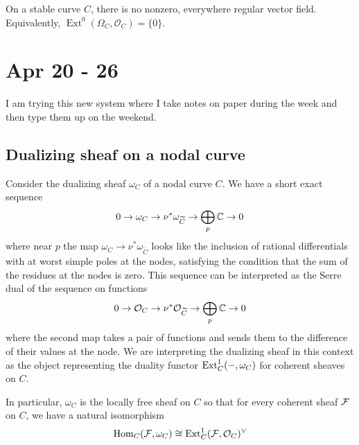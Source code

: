 \documentclass[12pt]{article}
\begin{document}
\begin{proposition}
On a stable curve \(C\), there is no nonzero, everywhere regular vector field. Equivalently, \(\operatorname{Ext}^0(\Omega_C, \mathcal{O}_C) = \{0\}\).
\end{proposition}

\section{Apr 20 - 26}
I am trying this new system where I take notes on paper during the week and then type them up on the weekend. 
\subsection{Dualizing sheaf on a nodal curve}
Consider the dualizing sheaf $\omega_C$ of a nodal curve $C$. We have a short exact sequence \begin{align*}
    0 \to \omega_C \to \nu^*\omega_{\widetilde{C}} \to \bigoplus_p \mathbb{C} \to 0
\end{align*} where near $p$ the map $\omega_C \to \nu^*\omega_{\widetilde{C}}$ looks like the inclusion of rational differentials with at worst simple poles at the nodes, satisfying the condition that the sum of the residues at the nodes is zero. This sequence can be interpreted as the Serre dual of the sequence on functions \begin{align*}
    0 \to \mathcal{O}_C \to \nu^*\mathcal{O}_{\widetilde{C}} \to \bigoplus_p \mathbb{C} \to 0
\end{align*} where the second map takes a pair of functions and sends them to the difference of their values at the node. We are interpreting the dualizing sheaf in this context as the object representing the duality functor $\operatorname{Ext}^1_C(-, \omega_C)$ for coherent sheaves on $C$.

In particular, $\omega_C$ is the locally free sheaf on $C$ so that for every coherent sheaf ${\mathcal{F}}$ on $C$, we have a natural isomorphism \begin{align*}
    \operatorname{Hom}_C({\mathcal{F}}, \omega_C) \cong \operatorname{Ext}^1_C({\mathcal{F}}, \mathcal{O}_C)^\vee
\end{align*}
\end{document}

